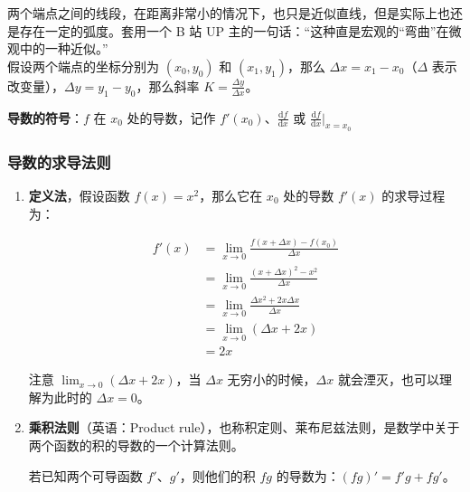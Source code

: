 \documentclass{ctexart}
\begin{document}
两个端点之间的线段，在距离非常小的情况下，也只是近似直线，但是实际上也还是存在一定的弧度。套用一个 B 站 UP 主的一句话：“这种直是宏观的“弯曲”在微观中的一种近似。”\\
假设两个端点的坐标分别为 $(x_0, y_0)$ 和 $(x_1, y_1)$，那么 $\Delta x = x_1 - x_0$（$\Delta$ 表示改变量），$\Delta y = y_1 - y_0$，那么斜率 $K = \frac{\Delta y}{\Delta x}$。

\begin{center}
\end{center}

\textbf{导数的符号}：$f$ 在 $x_0$ 处的导数，记作 $f'(x_0)$、$\frac{\mathrm{d}f}{\mathrm{d}x}$ 或 $\frac{\mathrm{d}f}{\mathrm{d}x}|_{x=x_0}$

\subsubsection{导数的求导法则}
\begin{enumerate}
	\item \textbf{定义法}，假设函数 $f(x) = x^2$，那么它在 $x_0$ 处的导数 $f'(x)$ 的求导过程为：

	      \[
		      \begin{aligned}
			      f'(x) & = \lim_{x \to 0} \frac {f(x + \Delta x) - f(x_0)}{\Delta x} \\
			            & = \lim_{x \to 0} \frac {(x + \Delta x)^2 - x^2}{\Delta x}   \\
			            & = \lim_{x \to 0} \frac {\Delta x^2 + 2x \Delta x}{\Delta x} \\
			            & = \lim_{x \to 0} (\Delta x + 2x)                            \\
			            & = 2x
		      \end{aligned}
	      \]

	      注意 $\lim_{x \to 0} (\Delta x + 2x)$，当 $\Delta x$ 无穷小的时候，$\Delta x$ 就会湮灭，也可以理解为此时的 $\Delta x = 0$。

	\item \textbf{乘积法则}（英语：Product rule），也称积定则、莱布尼兹法则，是数学中关于两个函数的积的导数的一个计算法则。

	      若已知两个可导函数 $f'$、$g'$，则他们的积 $fg$ 的导数为：$(fg)' = f'g + fg'$。
\end{enumerate}
\end{document}
